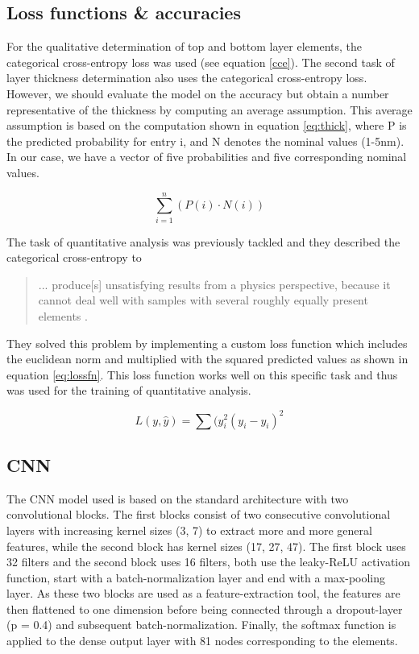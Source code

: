 \subsection{Loss functions \& accuracies}
For the qualitative determination of top and bottom layer elements, the categorical cross-entropy loss was used (see equation \ref{cce}).
The second task of layer thickness determination also uses the categorical cross-entropy loss. However, we should evaluate the model on the accuracy but obtain a number representative of the thickness by computing an average assumption. This average assumption is based on the computation shown in equation \ref{eq:thick}, where P is the predicted probability for entry i, and N denotes the nominal values (1-5nm). In our case, we have a vector of five probabilities and five corresponding nominal values.

\begin{equation}
\label{eq:thick}
    \sum_{i=1}^{n} (P(i) \cdot N(i))
\end{equation}

The task of quantitative analysis was previously tackled and they described the categorical cross-entropy to \begin{quote}
    ... produce[s] unsatisfying results from a physics perspective, because it cannot deal well
with samples with several roughly equally present elements \cite{drera_deep_2019}.
\end{quote}
They solved this problem by implementing a custom loss function which includes the euclidean norm and multiplied with the squared predicted values as shown in equation \ref{eq:lossfn}. This loss function works well on this specific task and thus was used for the training of quantitative analysis.

\begin{equation}
\label{eq:lossfn}
    L(y, \hat{y}) = \sum(y_{i}^2 (y_{i} - \hat{y_{i}})^2
\end{equation}


\subsection{CNN}
The CNN model used is based on the standard architecture with two convolutional blocks. The first blocks consist of two consecutive convolutional layers with increasing kernel sizes (3, 7) to extract more and more general features, while the second block has kernel sizes (17, 27, 47). The first block uses 32 filters and the second block uses 16 filters, both use the leaky-ReLU activation function, start with a batch-normalization layer and end with a max-pooling layer.
As these two blocks are used as a feature-extraction tool, the features are then flattened to one dimension before being connected through a dropout-layer (p = 0.4) and subsequent batch-normalization. Finally, the softmax function is applied to the dense output layer with 81 nodes corresponding to the elements.


